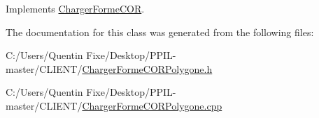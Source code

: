 Implements \hyperlink{class_charger_forme_c_o_r_a1d9563c3a1ff9d6d86aa87a83bdaf8da}{Charger\+Forme\+C\+OR}.



The documentation for this class was generated from the following files\+:\begin{DoxyCompactItemize}
\item 
C\+:/\+Users/\+Quentin Fixe/\+Desktop/\+P\+P\+I\+L-\/master/\+C\+L\+I\+E\+N\+T/\hyperlink{_charger_forme_c_o_r_polygone_8h}{Charger\+Forme\+C\+O\+R\+Polygone.\+h}\item 
C\+:/\+Users/\+Quentin Fixe/\+Desktop/\+P\+P\+I\+L-\/master/\+C\+L\+I\+E\+N\+T/\hyperlink{_charger_forme_c_o_r_polygone_8cpp}{Charger\+Forme\+C\+O\+R\+Polygone.\+cpp}\end{DoxyCompactItemize}
